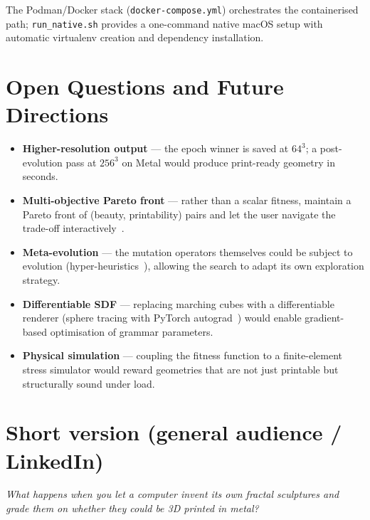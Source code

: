 \documentclass[11pt, a4paper]{article}
\newcommand{\code}[1]{\texttt{#1}}
\begin{document}
The Podman/Docker stack (\code{docker-compose.yml}) orchestrates the
containerised path; \code{run\_native.sh} provides a one-command native macOS
setup with automatic virtualenv creation and dependency installation.

\section{Open Questions and Future Directions}
\label{sec:future}

\begin{itemize}[leftmargin=1.8em]
  \item \textbf{Higher-resolution output} — the epoch winner is saved at
        $64^3$; a post-evolution pass at $256^3$ on Metal would produce
        print-ready geometry in seconds.
  \item \textbf{Multi-objective Pareto front} — rather than a scalar fitness,
        maintain a Pareto front of (beauty, printability) pairs and let the
        user navigate the trade-off interactively~\cite{deb2002nsga}.
  \item \textbf{Meta-evolution} — the mutation operators themselves could be
        subject to evolution (hyper-heuristics~\cite{burke2013hyper}), allowing
        the search to adapt its own exploration strategy.
  \item \textbf{Differentiable SDF} — replacing marching cubes with a
        differentiable renderer (sphere tracing with PyTorch
        autograd~\cite{park2019deepsdf}) would enable gradient-based
        optimisation of grammar parameters.
  \item \textbf{Physical simulation} — coupling the fitness function to a
        finite-element stress simulator would reward geometries that are not
        just printable but structurally sound under load.
\end{itemize}

\section*{Short version (general audience / LinkedIn)}

\textit{What happens when you let a computer invent its own fractal sculptures
and grade them on whether they could be 3D printed in metal?}
\end{document}
